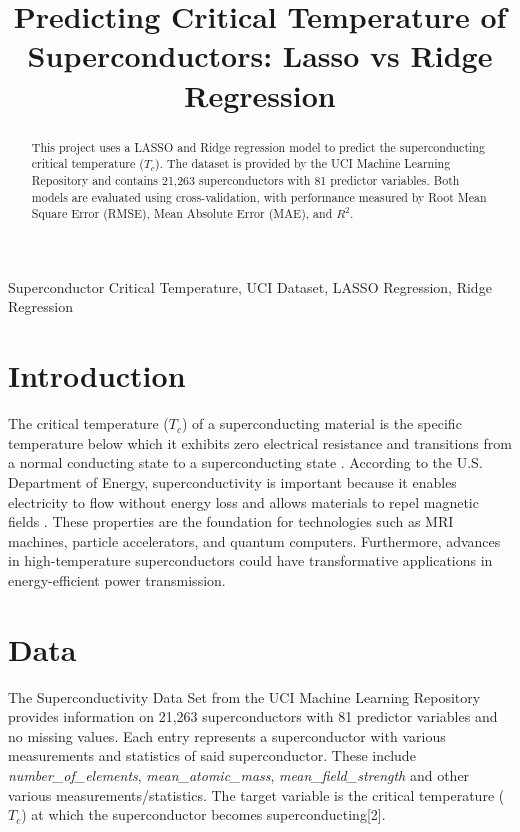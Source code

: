 \documentclass[conference]{IEEEtran}
\title{Predicting Critical Temperature of Superconductors: Lasso vs Ridge Regression}
\author{
  \IEEEauthorblockN{Miguel Ramirez}
  \IEEEauthorblockA{
    Department of Statistics and Data Science \\
    University of Central Florida \\
    Orlando, United States \\
    mi723380@ucf.edu}
}
\begin{document}
\maketitle

\begin{abstract}
This project uses a LASSO and Ridge regression model to predict the superconducting critical temperature ($T_c$). 
The dataset is provided by the UCI Machine Learning Repository and contains 21,263 superconductors with 81 predictor variables. 
Both models are evaluated using cross-validation, with performance measured by Root Mean Square Error (RMSE), Mean Absolute Error (MAE), and $R^2$.
\end{abstract}
\begin{IEEEkeywords}
Superconductor Critical Temperature, UCI Dataset, LASSO Regression, Ridge Regression
\end{IEEEkeywords}

\section*{Introduction}

The critical temperature ($T_c$) of a superconducting material is the specific temperature below which it exhibits zero electrical resistance and transitions from a normal conducting state to a superconducting state \cite{sciencedirect_tc}.
According to the U.S. Department of Energy, superconductivity is important because it enables electricity to flow without energy loss and allows materials to repel magnetic fields \cite{doe_superconductivity}.
These properties are the foundation for technologies such as MRI machines, particle accelerators, and quantum computers. 
Furthermore, advances in high-temperature superconductors could have transformative applications in energy-efficient power transmission.

\section{Data}
The Superconductivity Data Set from the UCI Machine Learning Repository provides information on 21,263 superconductors with 81 predictor variables and no missing values. 
Each entry represents a superconductor with various measurements and statistics of said superconductor. These include \emph{number\_of\_elements}, \emph{mean\_atomic\_mass}, \emph{mean\_field\_strength} and other various measurements/statistics. 
The target variable is the critical temperature ($T_c$) at which the superconductor becomes superconducting[2]. 
\end{document}
